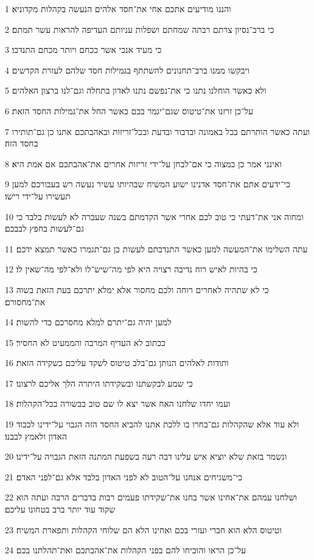 \par 1 והננו מודיעים אתכם אחי את־חסד אלהים הנעשה בקהלות מקדוניא׃
\par 2 כי ברב־נסיון צרתם רבתה שמחתם ושפלות עניותם העדיפה להראות עשר תמתם׃
\par 3 כי מעיד אנכי אשר ככחם ויותר מכחם התנדבו׃
\par 4 ויבקשו ממנו ברב־תחנונים להשתתף בגמילות חסד שלהם לעזרת הקדשים׃
\par 5 ולא כאשר הוחלנו נתנו כי את־נפשם נתנו לאדון בתחלה וגם־לנו ברצון האלהים׃
\par 6 על־כן זרזנו את־טיטוס שגם־יגמר בכם כאשר החל את־גמילות החסד הזאת׃
\par 7 ועתה כאשר הותרתם בכל באמונה ובדבור ובדעת ובכל־זריזות ובאהבתכם אתנו כן גם־תותירו בחסד הזה׃
\par 8 ואינני אמר כן כמצוה כי אם־לבחן על־ידי זריזות אחרים את־אהבתכם אם אמת היא׃
\par 9 כי־ידעים אתם את־חסד אדנינו ישוע המשיח שבהיותו עשיר נעשה רש בעבורכם למען תעשירו על־ידי רישו׃
\par 10 ומחוה אני את־דעתי כי טוב לכם אחרי אשר הקדמתם בשנה שעברה לא לעשות בלבד כי גם־לעשות בחפץ לבבכם׃
\par 11 עתה השלימו את־המעשה למען כאשר התנדבתם לעשות כן גם־תגמרו כאשר תמצא ידכם׃
\par 12 כי בהיות לאיש רוח נדיבה רצויה היא לפי מה־שיש־לו ולא־לפי מה־שאין לו׃
\par 13 כי לא שתהיה לאחרים רוחה ולכם מחסור אלא ימלא יתרכם בעת הזאת בשוה את־מחסורם׃
\par 14 למען יהיה גם־יתרם למלא מחסרכם כדי להשות׃
\par 15 ככתוב לא העדיף המרבה והממעיט לא החסיר׃
\par 16 ותודות לאלהים הנותן גם־בלב טיטוס לשקד עליכם כשקידה הזאת׃
\par 17 כי שמע לבקשתנו ובשקידתו היתרה הלך אליכם לרצונו׃
\par 18 ועמו יחדו שלחנו האח אשר יצא לו שם טוב בבשורה בכל־הקהלות׃
\par 19 ולא עוד אלא שהקהלות גם־בחרו בו ללכת אתנו להביא החסד הזה הגבוי על־ידינו לכבוד האדון ולאמץ לבבנו׃
\par 20 ונשמר בזאת שלא יוציא איש עלינו דבה רעה בשפעת המתנה הזאת הגבויה על־ידינו׃
\par 21 כי־משגיחים אנחנו על־הטוב לא לפני האדון בלבד אלא גם־לפני האדם׃
\par 22 ושלחנו עמהם את־אחינו אשר בחנו את־שקידתו פעמים רבות בדברים הרבה ועתה הוא שקוד עוד יותר ברב בטחונו עליכם׃
\par 23 וטיטוס הלא הוא חברי ועזרי בכם ואחינו הלא הם שלוחי הקהלות ותפארת המשיח׃
\par 24 על־כן הראו והוכיחו להם בפני הקהלות את־אהבתכם ואת־תהלתנו בכם׃

